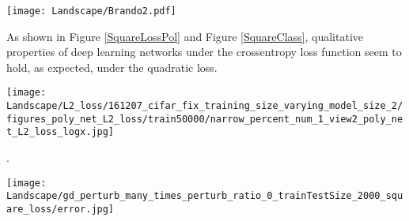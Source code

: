 \documentclass[10pt]{article}
\begin{document}
\begin{figure*}[h!]\centering
\texttt{[image: Landscape/Brando2.pdf]}
\caption{\it The graph on the left shows training and testing loss for
  a linear network in the feature space (i.e. $y=W\Phi(X)$) in the
  nondegenerate quadratic convex case.  The feature matrix $\phi(X)$
  is a polynomial with degree 4.  The target function is a sine
  function $f(x) = sin(2 \pi f x) $ with frequency $f=4$ on the
  interval $[-1,1]$.  The number of training point are $9$ while the
  number of test points are $100$.  The training was done with full
  gradient descent with step size $0.2$ for $250,000$ iterations. The
  inset zooms in on plot showing the absense of overfitting. In the
  plot on the right, weights were perturbed every $4000$ iterations
  and then gradient descent was allowed to converge to zero training
  error after each perturbation.  The weights were perturbed by adding
  Gaussian noise with mean $0$ and standard deviation $0.6$.  The plot
  on the left had no perturbation.  The $L_2$ norm of the weights is
  shown on the right.  Note that training was repeated 30 times and
  what is reported in the figure is the average train and test error
  as well as average norm of the weights over the 30 repetitions.}
\label{Brando2}
\end{figure*}

As shown in Figure \ref{SquareLossPol} and Figure \ref{SquareClass}, qualitative
  properties of deep learning networks under the crossentropy loss
  function seem to hold, as expected, under the quadratic loss. 
\begin{figure*}[h!]\centering
\texttt{[image: Landscape/L2\_loss/161207\_cifar\_fix\_training\_size\_varying\_model\_size\_2/figures\_poly\_net\_L2\_loss/train50000/narrow\_percent\_num\_1\_view2\_poly\_net\_L2\_loss\_logx.jpg]}
\caption{\it The figure shows the behavior of a deep polynomial
  network trained on the CIFAR database, using the square loss. To be
  compared with Figure \ref{GreatPlot}}.
\label{SquareLossPol}
\end{figure*}

\begin{figure*}[h!]\centering
\texttt{[image: Landscape/gd\_perturb\_many\_times\_perturb\_ratio\_0\_trainTestSize\_2000\_square\_loss/error.jpg]}
\caption{\it Classification  error  on CIFAR obtained with GD
  optimizing the square loss risk. The training set has $2000$
  examples and the network has $188810$ parameters. Overfitting
  appears here for the classification error.}
\label{SquareClass}
\end{figure*}
\end{document}
